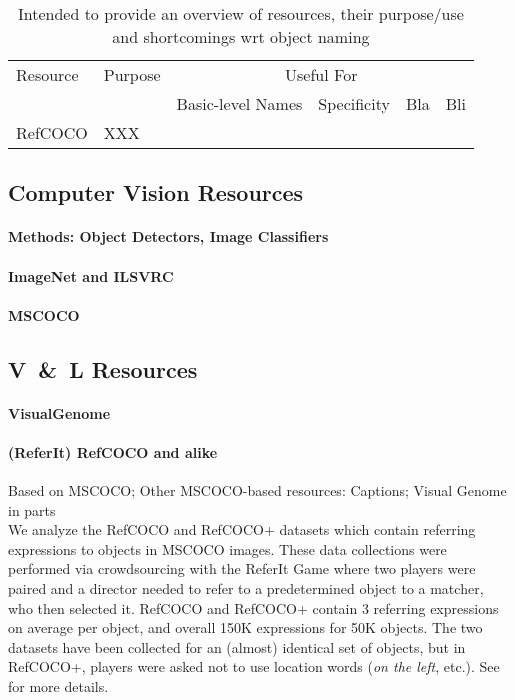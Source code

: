 \begin{table*}[t]
	\begin{tabular}{|l|l|llll|}
		\hline
		Resource & Purpose & \multicolumn{4}{c|}{Useful For}\\
				& 			& Basic-level Names & Specificity & Bla & Bli \\
		\hline \hline
		RefCOCO & XXX & 
	\end{tabular}
	\caption{\label{tab:summary_resources} Intended to provide an overview of resources, their purpose/use and shortcomings wrt object naming}
\end{table*}

\subsection{Computer Vision Resources}
\paragraph{Methods: Object Detectors, Image Classifiers}

\paragraph{ImageNet and ILSVRC}
\paragraph{MSCOCO} \cite{mscoco}

\subsection{V\ \&\ L Resources}
\paragraph{VisualGenome}
\paragraph{(ReferIt) RefCOCO and alike}
Based on MSCOCO; Other MSCOCO-based resources: Captions; Visual Genome in parts\\

We analyze the RefCOCO and RefCOCO+ datasets which contain referring expressions to objects in MSCOCO \cite{mscoco} images.
These data collections were performed via crowdsourcing with the ReferIt Game \cite{Kazemzadeh2014}  where two players were paired and a director needed to refer to a predetermined object to a matcher, who then selected it.
RefCOCO and RefCOCO+ contain 3 referring expressions on average per object, and overall 150K expressions for 50K objects. 
The two datasets have been collected for an (almost) identical set of objects, but in RefCOCO+, players were asked not to use location words (\textit{on the left}, etc.).
See \cite{Yu2016} for more details. 

